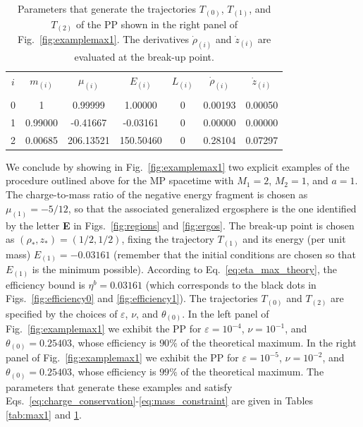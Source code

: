 \begin{table}[h]
  \centering
  \begin{tabular}{ccccccc}
    \hline\hline
    $i$ & $m_{(i)}$ & $\mu_{(i)}$ & $E_{(i)}$ & $L_{(i)}$ & $\dot{\rho}_{(i)}$ & $\dot{z}_{(i)}$ \\ \vspace{-0.3cm} \\
    0   & 1         & 0.99999     & 1.00000   & 0         & 0.00193            & 0.00050         \\
    1   & 0.99000   & -0.41667    & -0.03161  & 0         & 0.00000            & 0.00000         \\
    2   & 0.00685   & 206.13521   & 150.50460 & 0         & 0.28104            & 0.07297         \\
    \hline\hline
  \end{tabular}
  \caption{Parameters that generate the trajectories $T_{(0)}$, $T_{(1)}$, and $T_{(2)}$ of the PP shown in the right panel of Fig.~\ref{fig:examplemax1}. The derivatives $\dot{\rho}_{(i)}$ and $\dot{z}_{(i)}$ are evaluated at the break-up point.
  }
  \label{tab:max2}
\end{table}

We conclude by showing in Fig.~\ref{fig:examplemax1} two explicit examples of the procedure outlined above for the MP spacetime with $M_1=2$, $M_2=1$, and $a=1$. The charge-to-mass ratio of the negative energy fragment is chosen as $\mu_{(1)}=-5/12$, so that the associated generalized ergosphere is the one identified by the letter \textbf{E} in Figs.~\ref{fig:regions} and \ref{fig:ergos}. The  break-up point is chosen as $(\rho_*,z_*)=(1/2,1/2)$, fixing the trajectory $T_{(1)}$ and its energy (per unit mass) $E_{(1)}=-0.03161$ (remember that the initial conditions are chosen so that $E_{(1)}$ is the minimum possible). According to Eq.~\eqref{eq:eta_max_theory}, the efficiency bound is $\eta^{b} = 0.03161$ (which corresponds to the black dots in Figs.~\ref{fig:efficiency0} and \ref{fig:efficiency1}). The trajectories $T_{(0)}$ and $T_{(2)}$ are specified by the choices of $\varepsilon$, $\nu$, and $\theta_{(0)}$. In the left panel of Fig.~\ref{fig:examplemax1}  we exhibit the PP for $\varepsilon=10^{-4}$, $\nu=10^{-1}$, and $\theta_{(0)}=0.25403$, whose efficiency is $90 \%$ of the theoretical maximum. In the right panel of Fig.~\ref{fig:examplemax1} we exhibit the PP for $\varepsilon=10^{-5}$, $\nu=10^{-2}$, and $\theta_{(0)}=0.25403$, whose efficiency is $99 \%$ of the theoretical maximum. The parameters that generate these examples and satisfy Eqs.~\eqref{eq:charge_conservation}-\eqref{eq:mass_constraint} are  given in Tables \ref{tab:max1} and \ref{tab:max2}.